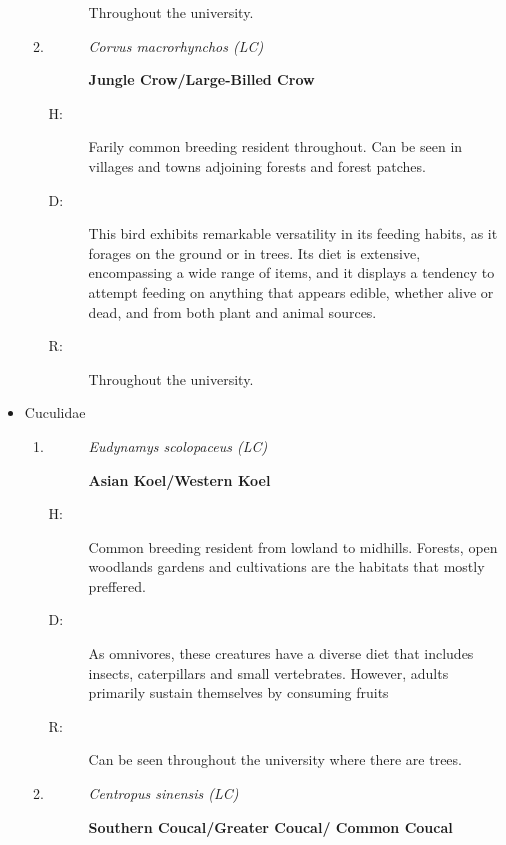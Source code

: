 \begin{itemize}
\begin{enumerate}
\begin{description}
Throughout the university. %
\end{description}%
\item%
\begin{description}%
\item[]%
\textit{Corvus macrorhynchos (LC)}%
\item[]%
\textbf{Jungle Crow/Large{-}Billed Crow}%
\end{description}%
\begin{description}%
\item[H: ]%
Farily common breeding resident throughout. Can be seen in villages and towns adjoining forests and forest patches.%
\item[D: ]%
This bird exhibits remarkable versatility in its feeding habits, as it forages on the ground or in trees. Its diet is extensive, encompassing a wide range of items, and it displays a tendency to attempt feeding on anything that appears edible, whether alive or dead, and from both plant and animal sources.%
\item[R: ]%
Throughout the university. %
\end{description}%
\end{enumerate}%
\item%
Cuculidae%
\begin{enumerate}%
\item%
\begin{description}%
\item[]%
\textit{Eudynamys scolopaceus (LC)}%
\item[]%
\textbf{Asian Koel/Western Koel}%
\end{description}%
\begin{description}%
\item[H: ]%
Common breeding resident from lowland to midhills. Forests, open woodlands gardens and cultivations are the habitats that mostly preffered.%
\item[D: ]%
As omnivores, these creatures have a diverse diet that includes insects, caterpillars and small vertebrates. However, adults primarily sustain themselves by consuming fruits%
\item[R: ]%
Can be seen throughout the university where there are trees.%
\end{description}%
\item%
\begin{description}%
\item[]%
\textit{Centropus sinensis (LC)}%
\item[]%
\textbf{Southern Coucal/Greater Coucal/ Common Coucal}%

\end{description}
\end{enumerate}
\end{itemize}
